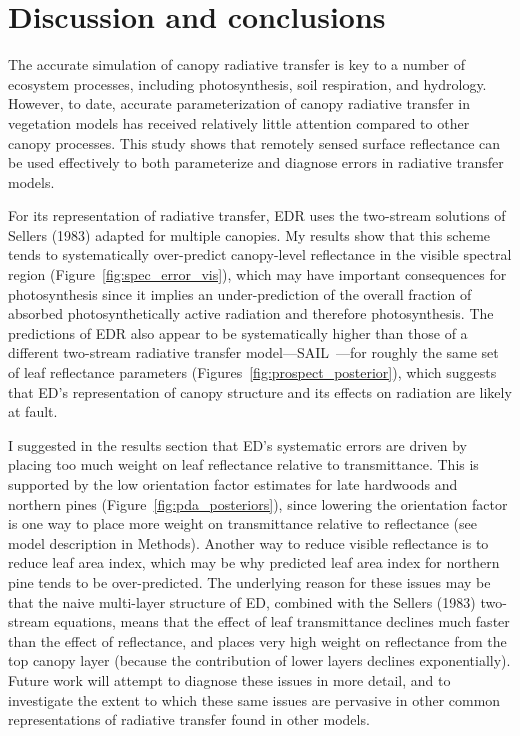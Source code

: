 \section{Discussion and conclusions}

The accurate simulation of canopy radiative transfer is key to a number of ecosystem processes, including photosynthesis, soil respiration, and hydrology.
However, to date, accurate parameterization of canopy radiative transfer in vegetation models has received relatively little attention compared to other canopy processes.
This study shows that remotely sensed surface reflectance can be used effectively to both parameterize and diagnose errors in radiative transfer models.

For its representation of radiative transfer, EDR uses the two-stream solutions of Sellers (1983) adapted for multiple canopies.
My results show that this scheme tends to systematically over-predict canopy-level reflectance in the visible spectral region (Figure~\ref{fig:spec_error_vis}), which may have important consequences for photosynthesis since it implies an under-prediction of the overall fraction of absorbed photosynthetically active radiation and therefore photosynthesis.
The predictions of EDR also appear to be systematically higher than those of a different two-stream radiative transfer model---SAIL~\cite{verhoef_1984_sail}---for roughly the same set of leaf reflectance parameters (Figures~\ref{fig:prospect_posterior}), which suggests that ED's representation of canopy structure and its effects on radiation are likely at fault.

I suggested in the results section that ED's systematic errors are driven by placing too much weight on leaf reflectance relative to transmittance.
This is supported by the low orientation factor estimates for late hardwoods and northern pines (Figure~\ref{fig:pda_posteriors}), since lowering the orientation factor is one way to place more weight on transmittance relative to reflectance (see model description in Methods).
Another way to reduce visible reflectance is to reduce leaf area index, which may be why predicted leaf area index for northern pine tends to be over-predicted.
The underlying reason for these issues may be that the naive multi-layer structure of ED, combined with the Sellers (1983) two-stream equations, means that the effect of leaf transmittance declines much faster than the effect of reflectance, and places very high weight on reflectance from the top canopy layer (because the contribution of lower layers declines exponentially).
Future work will attempt to diagnose these issues in more detail, and to investigate the extent to which these same issues are pervasive in other common representations of radiative transfer found in other models. 

